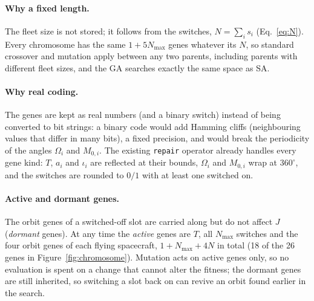 \paragraph{Why a fixed length.} The fleet size is not stored; it follows from the switches,
$N=\sum_i s_i$ (Eq.~\ref{eq:N}). Every chromosome has the same $1+5N_{\max}$ genes whatever its
$N$, so standard crossover and mutation apply between any two parents, including parents with
different fleet sizes, and the \ac{GA} searches exactly the same space as \ac{SA}.

\paragraph{Why real coding.} The genes are kept as real numbers (and a binary switch) instead of
being converted to bit strings: a binary code would add Hamming cliffs (neighbouring values that
differ in many bits), a fixed precision, and would break the periodicity of the angles $\Omega_i$
and $M_{0,i}$. The existing \texttt{repair} operator already handles every gene kind: $T$, $a_i$
and $\iota_i$ are reflected at their bounds, $\Omega_i$ and $M_{0,i}$ wrap at $360^\circ$, and the
switches are rounded to $0/1$ with at least one switched on.

\paragraph{Active and dormant genes.} The orbit genes of a switched-off slot are carried along
but do not affect $J$ (\emph{dormant} genes). At any time the \emph{active} genes are $T$, all
$N_{\max}$ switches and the four orbit genes of each flying spacecraft, $1+N_{\max}+4N$ in total
(18 of the 26 genes in Figure~\ref{fig:chromosome}). Mutation acts on active genes only, so no
evaluation is spent on a change that cannot alter the fitness; the dormant genes are still
inherited, so switching a slot back on can revive an orbit found earlier in the search.

